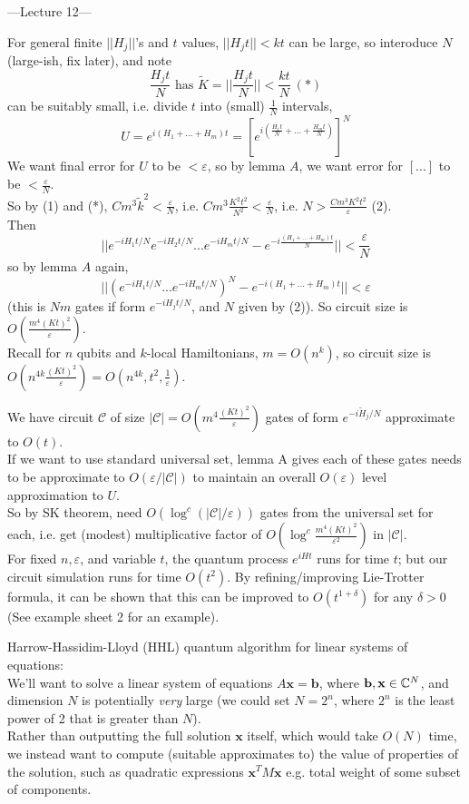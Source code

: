 \documentclass[a4paper]{article}
\begin{document}
---Lecture 12---

For general finite $||H_j||$'s and $t$ values, $||H_j t|| < kt$ can be large, so interoduce $N$ (large-ish, fix later), and note 
$$\frac{H_j t}{N} \text{ has } \tilde{K} = ||\frac{H_j t}{N}|| < \frac{kt}{N}\ (*)$$
can be suitably small, i.e. divide $t$ into (small) $\frac{1}{N}$ intervals,
$$U=e^{i(H_1+...+H_m)t} = [e^{i(\frac{H_1t}{N} + ... + \frac{H_mt}{N})}]^N$$
We want final error for $U$ to be $<\varepsilon$, so by lemma $A$, we want error for $[...]$ to be $<\frac{\varepsilon}{N}$.\\
So by (1) and (*), $Cm^3 \tilde{k}^2 < \frac{\varepsilon}{N}$, i.e. $Cm^3 \frac{K^2t^2}{N^2} < \frac{\varepsilon}{N}$, i.e. $N>\frac{Cm^3K^2t^2}{\varepsilon}$ (2).\\
Then 
$$||e^{-iH_1t/N} e^{-iH_2t/N}...e^{-iH_mt/N} - e^{-i\frac{(H_1+...+H_m)t}{N}}|| < \frac{\varepsilon}{N}$$
so by lemma $A$ again,
$$||(e^{-iH_1t/N}...e^{-iH_mt/N})^N - e^{-i(H_1+...+H_m)t}||< \varepsilon$$
(this is $Nm$ gates if form $e^{-iH_jt/N}$, and $N$ given by (2)). So circuit size is $O(\frac{m^4(Kt)^2}{\varepsilon})$.\\
Recall for $n$ qubits and $k$-local Hamiltonians, $m=O(n^k)$, so circuit size is $O(n^{4k} \frac{(Kt)^2}{\varepsilon}) = O(n^{4k},t^2,\frac{1}{\varepsilon})$.

We have circuit $\mathcal{C}$ of size $|\mathcal{C}| = O(m^4 \frac{(Kt)^2}{\varepsilon})$ gates of form $e^{-i\tilde{H}_j/N}$ approximate to $O(t)$.\\
If we want to use standard universal set, lemma A gives each of these gates needs to be approximate to $O(\varepsilon/|\mathcal{C}|)$ to maintain an overall $O(\varepsilon)$ level approximation to $U$.\\
So by SK theorem, need $O(\log^c(|\mathcal{C}|/\varepsilon))$ gates from the universal set for each, i.e. get (modest) multiplicative factor of $O(\log^c \frac{m^4(Kt)^2}{\varepsilon^2})$ in $|\mathcal{C}|$.\\

For fixed $n,\varepsilon$, and variable $t$, the quantum process $e^{iHt}$ runs for time $t$; but our circuit simulation runs for time $O(t^2)$. By refining/improving Lie-Trotter formula, it can be shown that this can be improved to $O(t^{1+\delta})$ for any $\delta>0$ (See example sheet 2 for an example).

Harrow-Hassidim-Lloyd (HHL) quantum algorithm for linear systems of equations:\\
We'll want to solve a linear system of equations $A \mathbf{x} = \mathbf{b}$, where $\mathbf{b},\mathbf{x} \in \mathbb{C}^N$, and dimension $N$ is potentially \emph{very} large (we could set $N=2^n$, where $2^n$ is the least power of 2 that is greater than $N$).\\
Rather than outputting the full solution $\mathbf{x}$ itself, which would take $O(N)$ time, we instead want to compute (suitable approximates to) the value of properties of the solution, such as quadratic expressions $\mathbf{x}^T M \mathbf{x}$ e.g. total weight of some subset of components.
\end{document}
